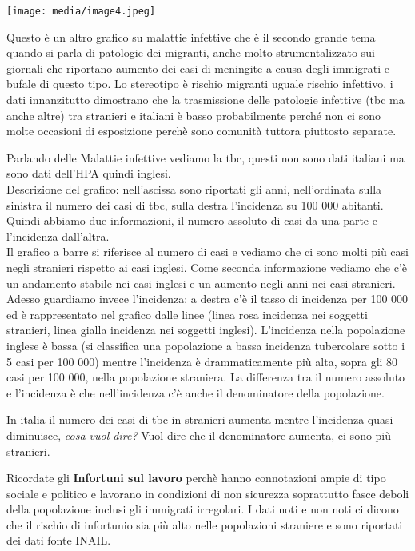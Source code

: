 \documentclass[]{article}
\begin{document}
\texttt{[image: media/image4.jpeg]}

Questo è un altro grafico su malattie infettive che è il secondo grande
tema quando si parla di patologie dei migranti, anche molto
strumentalizzato sui giornali che riportano aumento dei casi di
meningite a causa degli immigrati e bufale di questo tipo. Lo stereotipo
è rischio migranti uguale rischio infettivo, i dati innanzitutto
dimostrano che la trasmissione delle patologie infettive (tbc ma anche
altre) tra stranieri e italiani è basso probabilmente perché non ci sono
molte occasioni di esposizione perchè sono comunità tuttora piuttosto
separate.

Parlando delle Malattie infettive vediamo la tbc, questi non sono dati
italiani ma sono dati dell'HPA quindi inglesi.\\
Descrizione del grafico: nell'ascissa sono riportati gli anni,
nell'ordinata sulla sinistra il numero dei casi di tbc, sulla destra
l'incidenza su 100 000 abitanti. Quindi abbiamo due informazioni, il
numero assoluto di casi da una parte e l'incidenza dall'altra.\\
Il grafico a barre si riferisce al numero di casi e vediamo che ci sono
molti più casi negli stranieri rispetto ai casi inglesi. Come seconda
informazione vediamo che c'è un andamento stabile nei casi inglesi e un
aumento negli anni nei casi stranieri. Adesso guardiamo invece
l'incidenza: a destra c'è il tasso di incidenza per 100 000 ed è
rappresentato nel grafico dalle linee (linea rosa incidenza nei soggetti
stranieri, linea gialla incidenza nei soggetti inglesi). L'incidenza
nella popolazione inglese è bassa (si classifica una popolazione a bassa
incidenza tubercolare sotto i 5 casi per 100 000) mentre l'incidenza è
drammaticamente più alta, sopra gli 80 casi per 100 000, nella
popolazione straniera. La differenza tra il numero assoluto e
l'incidenza è che nell'incidenza c'è anche il denominatore della
popolazione.

In italia il numero dei casi di tbc in stranieri aumenta mentre
l'incidenza quasi diminuisce, \emph{cosa vuol dire?} Vuol dire che il
denominatore aumenta, ci sono più stranieri.

Ricordate gli \textbf{Infortuni sul lavoro} perchè hanno connotazioni
ampie di tipo sociale e politico e lavorano in condizioni di non
sicurezza soprattutto fasce deboli della popolazione inclusi gli
immigrati irregolari. I dati noti e non noti ci dicono che il rischio di
infortunio sia più alto nelle popolazioni straniere e sono riportati dei
dati fonte INAIL.
\end{document}
